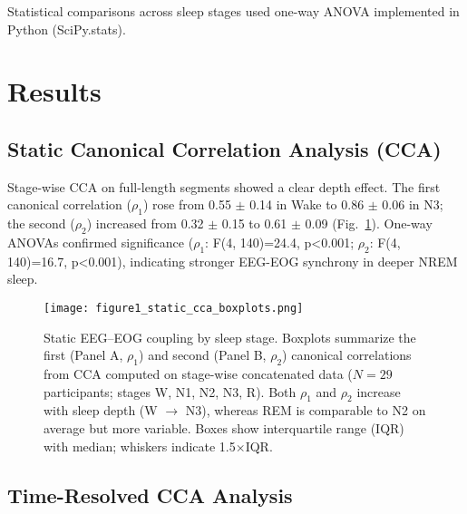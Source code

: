 Statistical comparisons across sleep stages used one-way ANOVA implemented in Python (SciPy.stats).

\section{Results}

\subsection{Static Canonical Correlation Analysis (CCA)}

Stage-wise CCA on full-length segments showed a clear depth effect. The first canonical correlation ($\rho_1$) rose from 0.55 $\pm$ 0.14 in Wake to 0.86 $\pm$ 0.06 in N3; the second ($\rho_2$) increased from 0.32 $\pm$ 0.15 to 0.61 $\pm$ 0.09 (Fig.~\ref{fig:figure1}). One-way ANOVAs confirmed significance ($\rho_1$: F(4, 140)=24.4, p<0.001; $\rho_2$: F(4, 140)=16.7, p<0.001), indicating stronger EEG-EOG synchrony in deeper NREM sleep.%
\begin{figure}[!t]
\centering
\texttt{[image: figure1\_static\_cca\_boxplots.png]}%
\caption{Static EEG--EOG coupling by sleep stage. Boxplots summarize the first (Panel A, $\rho_1$) and second (Panel B, $\rho_2$) canonical correlations from CCA computed on stage-wise concatenated data ($N=29$ participants; stages W, N1, N2, N3, R). Both $\rho_1$ and $\rho_2$ increase with sleep depth (W $\rightarrow$ N3), whereas REM is comparable to N2 on average but more variable. Boxes show interquartile range (IQR) with median; whiskers indicate 1.5$\times$IQR.}\label{fig:figure1}
\end{figure}%

\subsection{Time-Resolved CCA Analysis}

